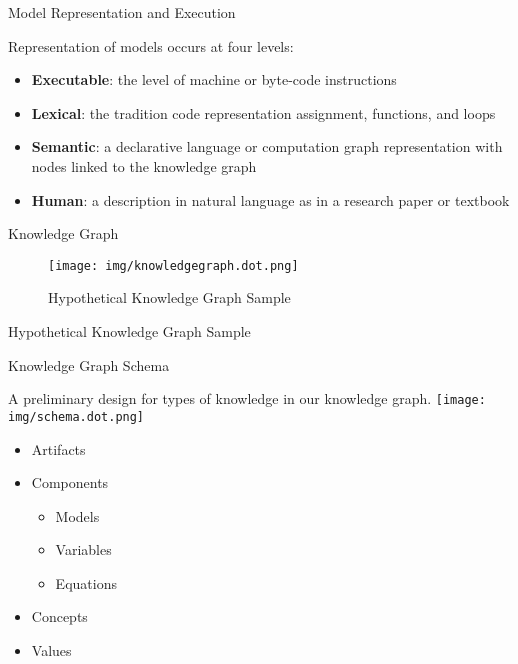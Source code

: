 \documentclass[ignorenonframetext,]{beamer}
\providecommand{\tightlist}{%
  \setlength{\itemsep}{0pt}\setlength{\parskip}{0pt}}
\begin{document}
\begin{frame}{Model Representation and Execution}
\protect\hypertarget{model-representation-and-execution}{}

Representation of models occurs at four levels:

\begin{itemize}
\item
  \textbf{Executable}: the level of machine or byte-code instructions
\item
  \textbf{Lexical}: the tradition code representation assignment,
  functions, and loops
\item
  \textbf{Semantic}: a declarative language or computation graph
  representation with nodes linked to the knowledge graph
\item
  \textbf{Human}: a description in natural language as in a research
  paper or textbook
\end{itemize}

\end{frame}

\begin{frame}{Knowledge Graph}
\protect\hypertarget{knowledge-graph}{}

\begin{figure}
\centering
\texttt{[image: img/knowledgegraph.dot.png]}
\caption{Hypothetical Knowledge Graph Sample}
\end{figure}

Hypothetical Knowledge Graph Sample

\end{frame}

\begin{frame}{Knowledge Graph Schema}
\protect\hypertarget{knowledge-graph-schema}{}

A preliminary design for types of knowledge in our knowledge graph.
\texttt{[image: img/schema.dot.png]}

\begin{itemize}
\tightlist
\item
  Artifacts
\item
  Components

  \begin{itemize}
  \tightlist
  \item
    Models
  \item
    Variables
  \item
    Equations
  \end{itemize}
\item
  Concepts
\item
  Values
\end{itemize}

\end{frame}
\end{document}
